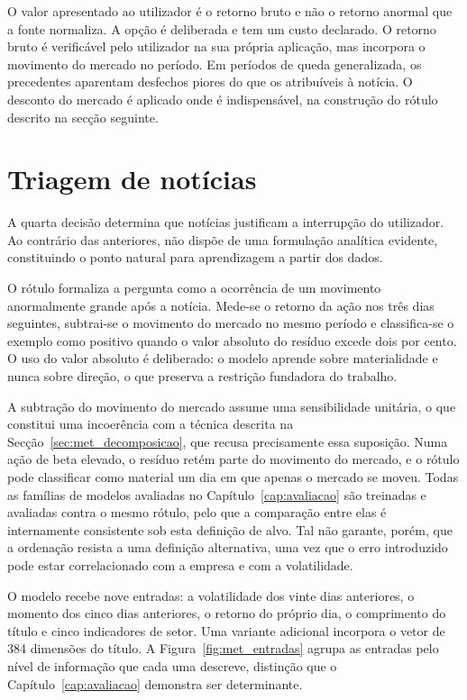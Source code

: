 O valor apresentado ao utilizador é o retorno bruto e não o retorno anormal que a fonte
normaliza. A opção é deliberada e tem um custo declarado. O retorno bruto é verificável pelo utilizador na
sua própria aplicação, mas incorpora o movimento do mercado no período. Em períodos de queda
generalizada, os precedentes aparentam desfechos piores do que os atribuíveis à notícia. O desconto do mercado é aplicado onde é indispensável, na construção do
rótulo descrito na secção seguinte.


\section{Triagem de notícias}
\label{sec:met_triagem}

A quarta decisão determina que notícias justificam a interrupção do utilizador. Ao contrário das
anteriores, não dispõe de uma formulação analítica evidente, constituindo o ponto natural para
aprendizagem a partir dos dados.

O rótulo formaliza a pergunta como a ocorrência de um movimento anormalmente grande após a
notícia. Mede-se o retorno da ação nos três dias seguintes, subtrai-se o movimento do mercado no
mesmo período e classifica-se o exemplo como positivo quando o valor absoluto do resíduo excede
dois por cento. O uso do valor absoluto é deliberado: o modelo aprende sobre materialidade e nunca
sobre direção, o que preserva a restrição fundadora do trabalho.

A subtração do movimento do mercado assume uma sensibilidade unitária, o que constitui uma
incoerência com a técnica descrita na Secção~\ref{sec:met_decomposicao}, que recusa precisamente
essa suposição. Numa ação de beta elevado, o resíduo retém parte do movimento do mercado, e o
rótulo pode classificar como material um dia em que apenas o mercado se moveu. Todas as famílias de
modelos avaliadas no Capítulo~\ref{cap:avaliacao} são treinadas e avaliadas contra o mesmo rótulo,
pelo que a comparação entre elas é internamente consistente sob esta definição de alvo. Tal não
garante, porém, que a ordenação resista a uma definição alternativa, uma vez que o erro introduzido
pode estar correlacionado com a empresa e com a volatilidade.

O modelo recebe nove entradas: a volatilidade dos vinte dias anteriores, o momento dos cinco dias
anteriores, o retorno do próprio dia, o comprimento do título e cinco indicadores de setor. Uma
variante adicional incorpora o vetor de 384 dimensões do título. A Figura~\ref{fig:met_entradas}
agrupa as entradas pelo nível de informação que cada uma descreve, distinção que o
Capítulo~\ref{cap:avaliacao} demonstra ser determinante.

